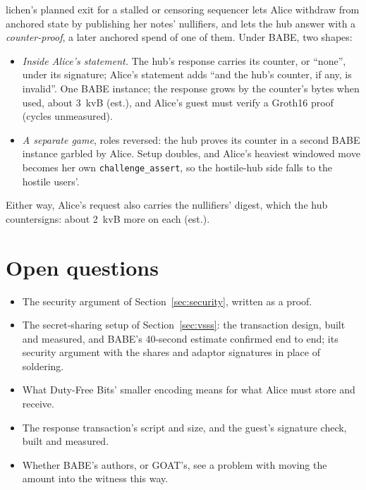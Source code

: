 \documentclass[11pt]{article}
\newcommand{\tx}[1]{\texttt{#1}}
\begin{document}
lichen's planned exit for a stalled or censoring sequencer lets Alice
withdraw from anchored state by publishing her notes' nullifiers, and
lets the hub answer with a \emph{counter-proof}, a later anchored spend
of one of them. Under BABE, two shapes:
\begin{itemize}[leftmargin=1.5em]
\item \emph{Inside Alice's statement.} The hub's response carries its
  counter, or ``none'', under its signature; Alice's statement adds
  ``and the hub's counter, if any, is invalid''. One BABE instance; the
  response grows by the counter's bytes when used, about 3~kvB (est.),
  and Alice's guest must verify a Groth16 proof (cycles unmeasured).
\item \emph{A separate game}, roles reversed: the hub proves its counter
  in a second BABE instance garbled by Alice. Setup doubles, and Alice's
  heaviest windowed move becomes her own \tx{challenge\_assert}, so the
  hostile-hub side falls to the hostile users'.
\end{itemize}
Either way, Alice's request also carries the nullifiers' digest, which
the hub countersigns: about 2~kvB more on each (est.).

\section{Open questions}
\label{sec:open}

\begin{itemize}[leftmargin=1.5em]
\item The security argument of Section~\ref{sec:security}, written as a
  proof.
\item The secret-sharing setup of Section~\ref{sec:vsss}: the
  transaction design, built and measured, and BABE's 40-second estimate
  confirmed end to end; its security argument with the shares and
  adaptor signatures in place of soldering.
\item What Duty-Free Bits' smaller encoding means for what Alice must
  store and receive.
\item The response transaction's script and size, and the guest's
  signature check, built and measured.
\item Whether BABE's authors, or GOAT's, see a problem with moving the
  amount into the witness this way.
\end{itemize}
\end{document}
